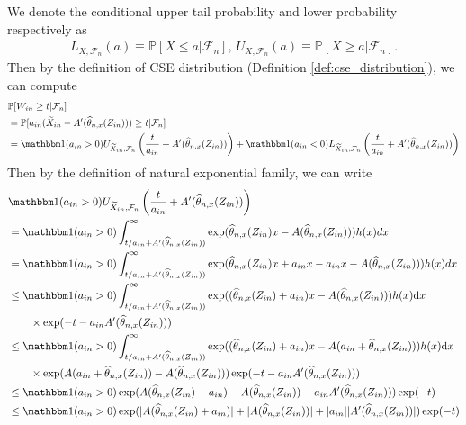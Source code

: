 \documentclass[12pt]{article}
\theoremstyle{definition}
\def\P{\mathbb{P}}
\def\P{\mathbb{P}}
\renewcommand{\P}{\mathbb{P}}							%
\newcommand{\indicator}{\mathbbm 1}						%
\newcommand{\srz}{Z}									%
\newcommand{\srxk}{\widetilde X}						%
\begin{document}
We denote the conditional upper tail probability and lower probability respectively as 
\begin{align*}
  L_{X,\mathcal{F}_n}(a)\equiv \P\left[X\leq a|\mathcal{F}_n\right],\ U_{X,\mathcal{F}_n}(a)\equiv \P\left[X\geq a|\mathcal{F}_n\right].
\end{align*}
Then by the definition of CSE distribution (Definition \ref{def:cse_distribution}),  we can compute 
\begin{align*}
  &
  \P[W_{in}\geq t|\mathcal{F}_n]\\
  &
  =\P[a_{in}(\srxk_{in}-A'(\widehat \theta_{n,x}(\srz_{in})))\geq t|\mathcal{F}_n]\\
  &
  =\indicator(a_{in}>0)U_{\srxk_{in},\mathcal{F}_n}\left(\frac{t}{a_{in}}+A'(\widehat{\theta}_{n,x}(\srz_{in}))\right)+\indicator(a_{in}<0)L_{\srxk_{in},\mathcal{F}_n}\left(\frac{t}{a_{in}}+A'(\widehat{\theta}_{n,x}(\srz_{in}))\right)
\end{align*}
Then by the definition of natural exponential family, we can write 
\begin{align*}
  &
  \indicator(a_{in}>0)U_{\srxk_{in},\mathcal{F}_n}\left(\frac{t}{a_{in}}+A'(\widehat{\theta}_{n,x}(\srz_{in}))\right)\\
  &
  =\indicator(a_{in}>0)\int_{t/a_{in}+A'(\widehat{\theta}_{n,x}(\srz_{in}))}^{\infty}\exp(\widehat{\theta}_{n,x}(\srz_{in})x-A(\widehat{\theta}_{n,x}(\srz_{in})))h(x)dx\\
  &
  =\indicator(a_{in}>0)\int_{t/a_{in}+A'(\widehat{\theta}_{n,x}(\srz_{in}))}^{\infty}\exp(\widehat{\theta}_{n,x}(\srz_{in})x+a_{in}x -a_{in}x-A(\widehat{\theta}_{n,x}(\srz_{in})))h(x)dx\\
  &
  \leq \indicator(a_{in}>0)\int_{t/a_{in}+A'(\widehat{\theta}_{n,x}(\srz_{in}))}^{\infty}\exp((\widehat{\theta}_{n,x}(\srz_{in})+a_{in})x-A(\widehat{\theta}_{n,x}(\srz_{in})))h(x)\mathrm{d}x\\
  &
  \qquad\times \exp(-t-a_{in}A'(\widehat{\theta}_{n,x}(\srz_{in})))\\
  &
  \leq \indicator(a_{in}>0)\int_{t/a_{in}+A'(\widehat{\theta}_{n,x}(\srz_{in}))}^{\infty}\exp((\widehat{\theta}_{n,x}(\srz_{in})+a_{in})x-A(a_{in}+\widehat{\theta}_{n,x}(\srz_{in})))h(x)\mathrm{d}x\\
  &
  \qquad\times \exp(A(a_{in}+\widehat{\theta}_{n,x}(\srz_{in}))-A(\widehat{\theta}_{n,x}(\srz_{in})))\exp(-t-a_{in}A'(\widehat{\theta}_{n,x}(\srz_{in})))\\
  &
  \leq \indicator(a_{in}>0)\exp(A(\widehat{\theta}_{n,x}(\srz_{in})+a_{in})-A(\widehat{\theta}_{n,x}(\srz_{in}))-a_{in}A'(\widehat{\theta}_{n,x}(\srz_{in})))\exp(-t)\\
  &
  \leq \indicator(a_{in}>0)\exp(|A(\widehat{\theta}_{n,x}(\srz_{in})+a_{in})|+|A(\widehat{\theta}_{n,x}(\srz_{in}))|+|a_{in}||A'(\widehat{\theta}_{n,x}(\srz_{in}))|)\exp(-t)
\end{align*}
\end{document}
